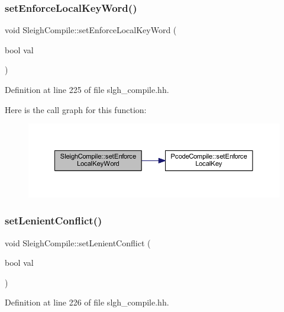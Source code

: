 \subsubsection{\texorpdfstring{setEnforceLocalKeyWord()}{setEnforceLocalKeyWord()}}
{\footnotesize\ttfamily void Sleigh\+Compile\+::set\+Enforce\+Local\+Key\+Word (\begin{DoxyParamCaption}\item[{bool}]{val }\end{DoxyParamCaption})\hspace{0.3cm}{\ttfamily [inline]}}



Definition at line 225 of file slgh\+\_\+compile.\+hh.

Here is the call graph for this function\+:
\nopagebreak
\begin{figure}[H]
\begin{center}
\leavevmode
\includegraphics[width=350pt]{class_sleigh_compile_a32aa844100006a43c9ecc9e4273337b4_cgraph}
\end{center}
\end{figure}
\mbox{\label{class_sleigh_compile_abffd3f40ea361e9d75de94285738c7de}} 
\subsubsection{\texorpdfstring{setLenientConflict()}{setLenientConflict()}}
{\footnotesize\ttfamily void Sleigh\+Compile\+::set\+Lenient\+Conflict (\begin{DoxyParamCaption}\item[{bool}]{val }\end{DoxyParamCaption})\hspace{0.3cm}{\ttfamily [inline]}}



Definition at line 226 of file slgh\+\_\+compile.\+hh.

\mbox{\label{class_sleigh_compile_af5f1126e010ecd977386150a77349137}} 

